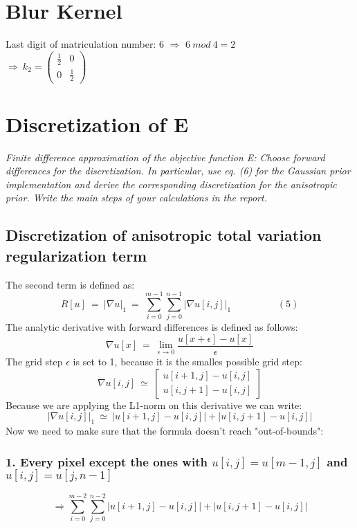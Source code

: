 \documentclass{report}
\begin{document}
	\section{Blur Kernel}
	\startsection
		Last digit of matriculation number: 6 $\Rightarrow$ $6 \ mod \ 4 = 2$ \\
		$\Rightarrow \ k_2 = \begin{pmatrix} \frac{1}{2} & 0 \\ 0 & \frac{1}{2} \end{pmatrix}$
	\closesection

	\section{Discretization of E}
	\startsection
		\textit{Finite difference approximation of the objective function E: Choose forward differences for the discretization.
In particular, use eq. (6) for the Gaussian prior implementation and derive the corresponding discretization
for the anisotropic prior. Write the main steps of your calculations in the report.}
		\subsection{Discretization of anisotropic total variation regularization term}
		\startsubsection
			The second term is defined as:
			\[ R[u] \ = \ | \nabla u | _1 \ = \ \sum_{i=0}^{m-1} \sum_{j=0}^{n-1} | \nabla u[i,j] | _1 \hspace{2cm} (5)\]
			The analytic derivative with forward differences is defined as follows:
			\[ \nabla u[x] \ = \ \lim_{\epsilon \rightarrow 0} \frac{u[x + \epsilon] - u[x]}{\epsilon} \]
			The grid step $\epsilon$ is set to 1, because it is the smalles possible grid step:
			\[ \nabla u[i,j] \ \simeq \ \begin{bmatrix} u[i+1,j] - u[i,j] \\ u[i,j+1] - u[i,j] \end{bmatrix} \]
			Because we are applying the L1-norm on this derivative we can write:
			\[ | \nabla u[i,j] | _1 \ \simeq \ | u[i+1,j] - u[i,j] | + | u[i,j+1] - u[i,j] | \]
			Now we need to make sure that the formula doesn't reach "out-of-bounds":
			\subsubsection{1. Every pixel except the ones with $u[i,j] = u[m-1,j]$ and $u[i,j] = u[j,n-1]$}
			\[
				\Rightarrow \sum_{i=0}^{m-2} \sum_{j=0}^{n-2} | u[i+1,j] - u[i,j] | + | u[i,j+1] - u[i,j] |
			\]
\end{document}
